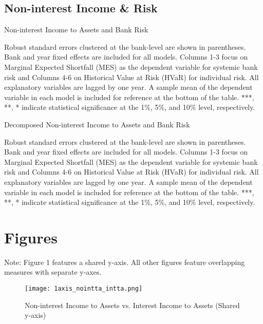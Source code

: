 \documentclass[10pt]{article} %
\begin{document}
\subsection{Non-interest Income \& Risk}
\thispagestyle{plain}
\begin{table}[H]
    \centering
  \caption{Non-interest Income to Assets and Bank Risk}
    {\renewcommand\normalsize{\small}%
    \normalsize
    }
\end{table}
\noindent\small{Robust standard errors clustered at the bank-level are shown in parentheses. Bank and year fixed effects are included for all models. Columns 1-3 focus on Marginal Expected Shortfall (MES) as the dependent variable for systemic bank risk and Columns 4-6 on Historical Value at Risk (HVaR) for individual risk. All explanatory variables are lagged by one year. A sample mean of the dependent variable in each model is included for reference at the bottom of the table. ***, **, * indicate statistical significance at the 1\%, 5\%, and 10\% level, respectively.}
\newpage


\thispagestyle{plain}
\begin{table}[H]
    \centering
  \caption{Decomposed Non-interest Income to Assets and Bank Risk}
    {\renewcommand\normalsize{\small}%
    \normalsize
    }
\end{table}
\noindent\small{Robust standard errors clustered at the bank-level are shown in parentheses. Bank and year fixed effects are included for all models. Columns 1-3 focus on Marginal Expected Shortfall (MES) as the dependent variable for systemic bank risk and Columns 4-6 on Historical Value at Risk (HVaR) for individual risk. All explanatory variables are lagged by one year. A sample mean of the dependent variable in each model is included for reference at the bottom of the table. ***, **, * indicate statistical significance at the 1\%, 5\%, and 10\% level, respectively.}


\newpage
\section{Figures} 
\thispagestyle{plain}
Note: Figure 1 features a shared y-axis. All other figures feature overlapping measures with separate y-axes. 

\begin{figure}[H] 
\caption{Non-interest Income to Assets vs. Interest Income to Assets (Shared y-axis)}
\centering 
\texttt{[image: 1axis\_nointta\_intta.png]}
\end{figure} 
\end{document}
